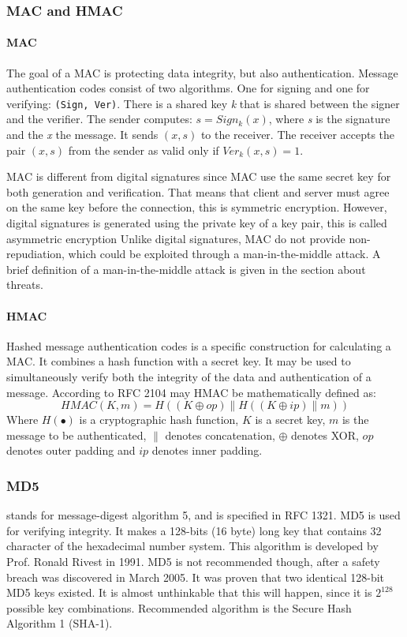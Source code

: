 \documentclass[11pt,a4paper, twocolumn]{article}
\begin{document}
\subsubsection{MAC and HMAC}
\paragraph{MAC} The goal of a MAC is protecting data integrity, but also authentication. Message authentication codes consist of two algorithms. One for signing and one for verifying: \texttt{(Sign, Ver)}. There is a shared key \textit{k} that is shared between the signer and the verifier. The sender computes: $s = Sign_{k}(x)$, where \textit{s} is the signature and the \textit{x} the message. It sends $(x, s)$ to the receiver. The receiver accepts the pair $(x, s)$ from the sender as valid only if $Ver_{k}(x, s) = 1$.

MAC is different from digital signatures since MAC use the same secret key for both generation and verification. That means that client and server must agree on the same key before the connection, this is symmetric encryption. However, digital signatures is generated using the private key of a key pair, this is called asymmetric encryption Unlike digital signatures, MAC do not provide non-repudiation, which could be exploited through a man-in-the-middle attack. A brief definition of a man-in-the-middle attack is given in the section about threats.

\paragraph{HMAC} Hashed message authentication codes is a specific construction for calculating a MAC. It combines a hash function with a secret key. It may be used to simultaneously verify both the integrity of the data and authentication of a message. According to RFC 2104 \cite{RFC 2104} may HMAC be mathematically defined as:
$$ HMAC(K, m) = H((K \oplus op) \parallel H((K \oplus ip) \parallel m)) $$
Where $H(\bullet)$ is a cryptographic hash function, $K$ is a secret key, $m$ is the message to be authenticated, $\parallel$ denotes concatenation, $\oplus$ denotes XOR, $op$ denotes outer padding and $ip$ denotes inner padding. 

\subsubsection{MD5} stands for message-digest algorithm 5, and is specified in RFC 1321. MD5 is used for verifying integrity. It makes a 128-bits (16 byte) long key that contains 32 character of the hexadecimal number system. This algorithm is developed by Prof. Ronald Rivest in 1991. MD5 is not recommended though, after a safety breach was discovered in March 2005. It was proven that two identical 128-bit MD5 keys existed. It is almost unthinkable that this will happen, since it is $2^{128}$ possible key combinations. Recommended algorithm is the Secure Hash Algorithm 1 (SHA-1).
\end{document}
